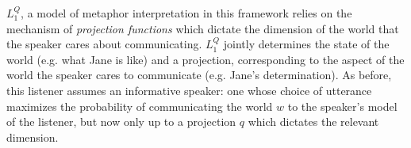 \documentclass[9pt,twocolumn,twoside,lineno]{pnas-new}
\newcommand{\Listener}{L}
\newcommand{\QLONE}{\Listener_{{1}}^{{Q}}}
\begin{document}

$\QLONE$, a model of metaphor interpretation in this framework \cite{kao} relies on the mechanism of \emph{projection functions} which dictate the dimension of the world that the speaker cares about communicating. $\QLONE$ jointly determines the state of the world (e.g. what Jane is like) and a projection, corresponding to the aspect of the world the speaker cares to communicate (e.g. Jane's determination). As before, this listener assumes an informative speaker: one whose choice of utterance maximizes the probability of communicating the world $w$ to the speaker's model of the listener, but now only up to a projection $q$ which dictates the relevant dimension.






\end{document}
